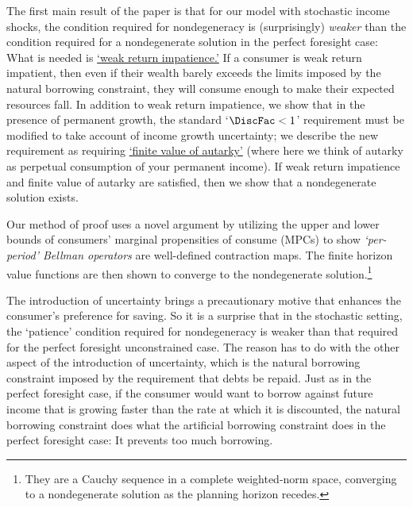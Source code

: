 \documentclass[BufferStockTheory]{subfiles}
\begin{document}
The first main result of the paper is that for our model with stochastic income shocks, the condition required for nondegeneracy is (surprisingly) \textit{weaker} than the condition required for a nondegenerate solution in the perfect foresight case: What is needed is \hyperlink{WRIC}{`weak return impatience.'} If a consumer is weak return impatient, then even if their wealth barely exceeds the limits imposed by the natural borrowing constraint, they will consume enough to make their expected resources fall. In addition to weak return impatience, we show that in the presence of permanent growth, the standard `$\DiscFac<1$' requirement must be modified to take account of income growth uncertainty; we describe the new requirement as requiring \hyperlink{FVAC}{`finite value of autarky'} (where here we think of autarky as perpetual consumption of your permanent income). If weak return impatience and finite value of autarky are satisfied, then we show that a nondegenerate solution  exists.

Our method of proof uses a novel argument by utilizing the upper and lower bounds of consumers' marginal propensities of consume (MPCs) to show \textit{`per-period' Bellman operators} are well-defined contraction maps. The finite horizon value functions are then shown to converge to the nondegenerate solution.\footnote{They are a Cauchy sequence in a complete weighted-norm space, converging to a nondegenerate solution as the planning horizon recedes.}

The introduction of uncertainty brings a precautionary motive that enhances the consumer's preference for saving.  So it is a surprise that in the stochastic setting, the `patience' condition required for nondegeneracy is weaker than that required for the perfect foresight unconstrained case.  The reason has to do with the other aspect of the introduction of uncertainty, which is the natural borrowing constraint imposed by the requirement that debts be repaid.  Just as in the perfect foresight case, if the consumer would want to borrow against future income that is growing faster than the rate at which it is discounted, the natural borrowing constraint does what the artificial borrowing constraint does in the perfect foresight case: It prevents too much borrowing.

% 

% 
\end{document}
